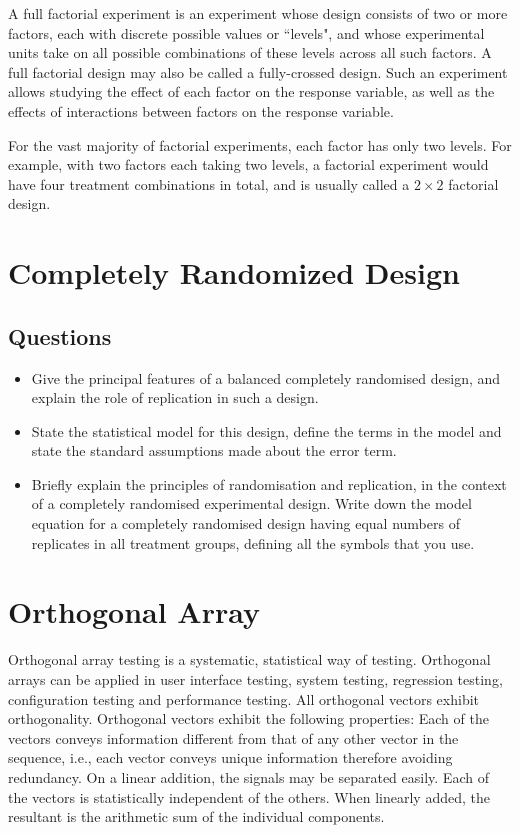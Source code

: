 A full factorial experiment is an experiment whose design consists of two or more factors, each with discrete possible values or ``levels", and whose experimental units take on all possible combinations of these levels across all such factors. A full factorial design may also be called a fully-crossed design. Such an experiment allows studying the effect of each factor on the response variable, as well as the effects of interactions between factors on the response variable.

For the vast majority of factorial experiments, each factor has only two levels. For example, with two factors each taking two levels, a factorial experiment would have four treatment combinations in total, and is usually called a $2\times2$ factorial design.

\newpage

\section{Completely Randomized Design}

\subsection{Questions}
\begin{itemize}
	\item Give the principal features of a  balanced completely randomised design, and
	explain the role of replication in such a design.  \item State the statistical model for
	this design, define the terms in the model and state the standard assumptions
	made about the error term.
	\item Briefly explain the principles of randomisation and replication, in the
	context of a completely randomised experimental design. Write down the model equation for a completely randomised design
	having equal numbers of replicates in all treatment groups, defining all
	the symbols that you use.
\end{itemize}
\section{Orthogonal Array}
Orthogonal array testing is a systematic, statistical way of testing. Orthogonal arrays can be applied in user interface testing, system testing, regression testing, configuration testing and performance testing.
All orthogonal vectors exhibit orthogonality. Orthogonal vectors exhibit the following properties:
Each of the vectors conveys information different from that of any other vector in the sequence, i.e., each vector conveys unique information therefore avoiding redundancy.
On a linear addition, the signals may be separated easily.
Each of the vectors is statistically independent of the others.
When linearly added, the resultant is the arithmetic sum of the individual components.


